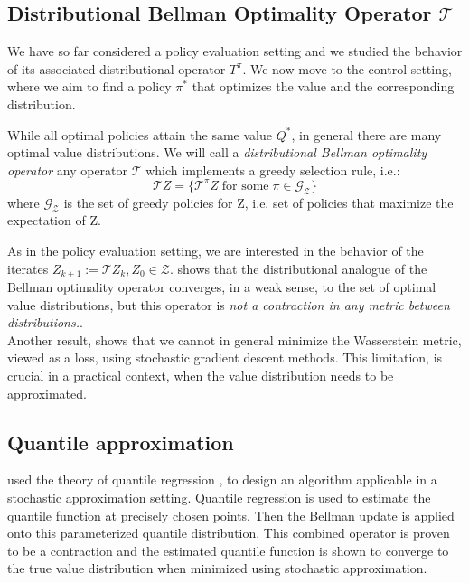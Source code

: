 \subsection{Distributional Bellman Optimality Operator $\mathcal{T}$}
We have so far considered a policy evaluation setting and we studied
the behavior of its associated distributional operator $T^\pi$.
We now move to the control setting, where we aim to find a policy $\pi^{*}$ that optimizes the value and the 
corresponding distribution.

While all optimal policies attain the same value $Q^{*}$, in general there are
many optimal value distributions.
We will call a \textit{distributional Bellman optimality operator} any operator $\mathcal{T}$ 
which implements a greedy selection
rule, i.e.:
\begin{equation*}
    \mathcal{T}Z = \big\{ \mathcal{T}^\pi Z \; \text{for some}\; \pi \in   \mathcal{G_Z} \big\}
\end{equation*}
where $\mathcal{G_Z}$ is the set of greedy policies for Z, i.e. set of policies that maximize
the expectation of Z.

As in the policy evaluation setting, we are interested in the behavior of the iterates 
$Z_{k+1} := \mathcal{T}Z_k, Z_0 \in \mathcal{Z}$.
\citet{Bellemare2017} shows that the distributional analogue of the Bellman optimality operator converges, in a weak sense,
to the set of optimal value distributions, but
this operator is \textit{not a contraction in any metric between distributions.}.\\

Another result, shows that we cannot in general minimize the Wasserstein metric, 
viewed as a loss, using stochastic gradient descent methods. This limitation, is crucial
in a practical context, when the value distribution needs to be approximated.

\subsection{Quantile approximation} \label{sec:appendix_quantile_approximation}
\cite{Dabney2018a} used the theory of quantile regression \cite{koenker2005}, to
design an algorithm applicable in a stochastic approximation setting.
Quantile regression is used to estimate the quantile function at precisely chosen points.
Then the Bellman update is applied onto this parameterized quantile distribution.
This combined operator is proven to be a contraction and the estimated quantile function
is shown to converge to the true value distribution when minimized using stochastic approximation.

